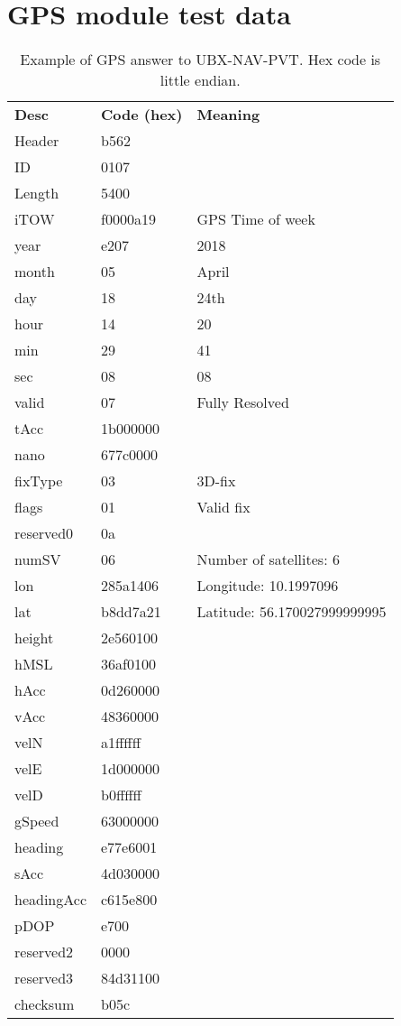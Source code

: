 \chapter{GPS module test data}
\label{app:GPSmodtest}
\begin{table}[H]
	\centering
	\setlength{\extrarowheight}{0pt}
	\begin{tabularx}{0.8\textwidth}{p{2cm} p{2cm} X}
		\oldtoprule
		\textbf{Desc} & \textbf{Code (hex)} & \textbf{Meaning} \\
		\oldmidrule
		Header & b562 & \\
		ID & 0107 & \\
		Length & 5400 & \\
		iTOW & f0000a19 & GPS Time of week \\
		year & e207 & 2018 \\
		month & 05 & April \\
		day & 18 & 24th \\
		hour & 14 & 20 \\
		min & 29 & 41 \\
		sec & 08 & 08 \\
		valid & 07 & Fully Resolved \\
		tAcc & 1b000000 & \\
		nano & 677c0000 & \\
		fixType & 03 & 3D-fix \\
		flags & 01 & Valid fix \\
		reserved0 & 0a & \\
		numSV & 06 & Number of satellites: 6 \\
		lon & 285a1406 & Longitude: \num{10.1997096} \\
		lat & b8dd7a21 & Latitude: \num{56.170027999999995} \\
		height & 2e560100 & \\
		hMSL & 36af0100 & \\
		hAcc & 0d260000 & \\
		vAcc & 48360000 & \\
		velN & a1ffffff & \\
		velE & 1d000000 & \\
		velD & b0ffffff & \\
		gSpeed & 63000000 & \\
		heading & e77e6001 & \\
		sAcc & 4d030000 & \\
		headingAcc & c615e800 & \\
		pDOP & e700 & \\
		reserved2 & 0000 & \\
		reserved3 & 84d31100 & \\
		checksum & b05c & \\
		\bottomrule
	\end{tabularx}
	\caption{Example of GPS answer to UBX-NAV-PVT\cite[p.~160-161]{NEO7_proto}. Hex code is little endian.}
	\label{tab:GPSmoddata}
\end{table}

